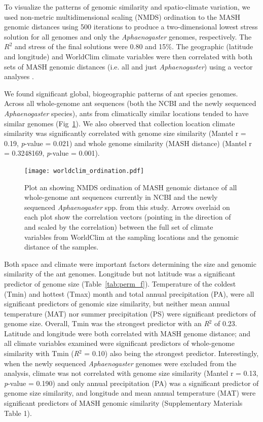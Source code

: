\documentclass[fleqn,10pt,lineno]{wlpeerj} %
\begin{document}
To visualize the patterns of genomic similarity and spatio-climate
variation, we used non-metric multidimensional scaling (NMDS)
ordination to the MASH genomic distances using 500 iterations to
produce a two-dimensional lowest stress solution for all genomes and
only the \textit{Aphaenogaster} genomes, respectively. The $R^2$ and
stress of the final solutions were 0.80 and 15\%. The geographic
(latitude and longitude) and WorldClim climate variables were then
correlated with both sets of MASH genomic distances (i.e. all and just
\textit{Aphaenogaster}) using a vector analyses \citep{Oksanen2016}.

We found significant global, biogeographic patterns of ant species
genomes. Across all whole-genome ant sequences (both the NCBI and the
newly sequenced \textit{Aphaenogaster} species), ants from
climatically similar locations tended to have similar genomes
(Fig~\ref{fig:wc_ord}). We also observed that collection location
climate similarity was significantly correlated with genome size
similarity (Mantel r = 0.19, \textit{p}-value = 0.021) and whole
genome similarity (MASH distance) (Mantel r = 0.3248169,
\textit{p}-value = 0.001).

\begin{figure}[ht]
\texttt{[image: worldclim\_ordination.pdf]}
\caption{Plot an showing NMDS ordination of MASH genomic distance of
  all whole-genome ant sequences currently in NCBI and the newly
  sequenced \textit{Aphaenogaster} spp. from this study. Arrows
  overlaid on each plot show the correlation vectors (pointing in the
  direction of and scaled by the correlation) between the full set of
  climate variables from WorldClim at the sampling locations and the
  genomic distance of the samples.}
\label{fig:wc_ord}
\end{figure}

Both space and climate were important factors determining the size and
genomic similarity of the ant genomes. Longitude but not latitude was
a significant predictor of genome size
(Table~\ref{tab:perm_f}). Temperature of the coldest (Tmin) and
hottest (Tmax) month and total annual precipitation (PA), were all
significant predictors of genomic size similarity, but neither mean
annual temperature (MAT) nor summer precipitation (PS) were
significant predictors of genome size. Overall, Tmin was the strongest
predictor with an \textit{R}$^2$ of 0.23. Latitude and longitude were
both correlated with MASH genome distance; and all climate variables
examined were significant predictors of whole-genome similarity with
Tmin (\textit{R}$^2$ = 0.10) also being the strongest
predictor. Interestingly, when the newly sequenced
\textit{Aphaenogaster} genomes were excluded from the analysis,
climate was not correlated with genome size similarity (Mantel r =
0.13, \textit{p}-value = 0.190) and only annual precipitation (PA) was
a significant predictor of genome size similarity, and longitude and
mean annual temperature (MAT) were significant predictors of MASH
genomic similarity (Supplementary Materials Table 1).
\end{document}
